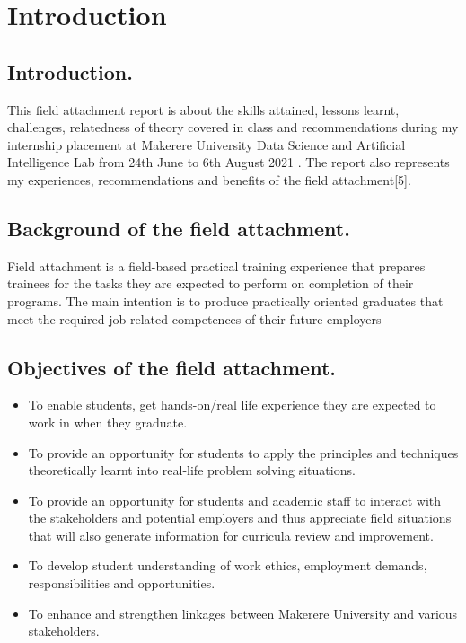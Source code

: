 \documentclass[11pt]{article}
\begin{document}
\newpage
\section{Introduction}\label{sec:intro}
\subsection{Introduction.}
This field attachment report is about the skills attained, lessons learnt, challenges, relatedness of
theory covered in class and recommendations during my internship placement at  Makerere University Data Science and Artificial Intelligence Lab from 24th June to 6th August 2021 . The report also
represents my experiences, recommendations and benefits of the field attachment[5].
\subsection{Background of the field attachment.}
Field attachment is a field-based practical training experience that prepares trainees for the tasks
they are expected to perform on completion of their programs. The main intention is to produce
practically oriented graduates that meet the required job-related competences of their future
employers
\subsection{Objectives of the field attachment.}
\begin{itemize}
	\item To enable students, get hands-on/real life experience they are expected to work in when
	they graduate.\\
	\item To provide an opportunity for students to apply the principles and techniques theoretically
	learnt into real-life problem solving situations. \\
	\item To provide an opportunity for students and academic staff to interact with the stakeholders
	and potential employers and thus appreciate field situations that will also generate
	information for curricula review and improvement.\\
	\item To develop student understanding of work ethics, employment demands, responsibilities
	and opportunities.\\
	\item To enhance and strengthen linkages between Makerere University and various
	stakeholders.\\
\end{itemize}
\end{document}
